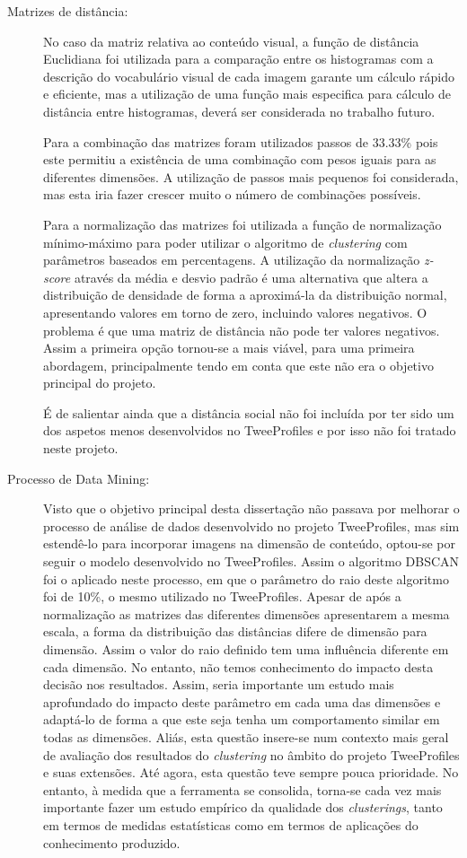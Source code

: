 \begin{description}
\item [Matrizes de distância:]
No caso da matriz relativa ao conteúdo visual, a função de distância Euclidiana foi utilizada para a comparação entre os histogramas com a descrição do vocabulário visual de cada imagem garante um cálculo rápido e eficiente, mas a utilização de uma função mais especifica para cálculo de distância entre histogramas, deverá ser considerada no trabalho futuro.

Para a combinação das matrizes foram utilizados passos de 33.33\% pois este permitiu a existência de uma combinação com pesos iguais para as diferentes dimensões. A utilização de passos mais pequenos foi considerada, mas esta iria fazer crescer muito o número de combinações possíveis. %

Para a normalização das matrizes foi utilizada a função de normalização mínimo-máximo para poder utilizar o algoritmo de \textit{clustering} com parâmetros baseados em percentagens. A utilização da normalização \textit{z-score} através da média e desvio padrão é uma alternativa que altera a distribuição de densidade de forma a aproximá-la da distribuição normal, apresentando valores em torno de zero, incluindo valores negativos. O problema é que uma matriz de distância não pode ter valores negativos. Assim a primeira opção tornou-se a mais viável, para uma primeira abordagem, principalmente tendo em conta que este não era o objetivo principal do projeto.

É de salientar ainda que a distância social não foi incluída por ter sido um dos aspetos menos desenvolvidos no TweeProfiles e por isso não foi tratado neste projeto.

\item [Processo de Data Mining:]
Visto que o objetivo principal desta dissertação não passava por melhorar o processo de análise de dados desenvolvido no projeto TweeProfiles, mas sim estendê-lo para incorporar imagens na dimensão de conteúdo, optou-se por seguir o modelo desenvolvido no TweeProfiles. Assim o algoritmo DBSCAN foi o aplicado neste processo, em que o parâmetro do raio deste algoritmo foi de 10\%, o mesmo utilizado no TweeProfiles. Apesar de após a normalização as matrizes das diferentes dimensões apresentarem a mesma escala, a forma da distribuição das distâncias difere de dimensão para dimensão. Assim o valor do raio definido tem uma influência diferente em cada dimensão. No entanto, não temos conhecimento do impacto desta decisão nos resultados. Assim, seria importante um estudo mais aprofundado do impacto deste parâmetro em cada uma das dimensões e adaptá-lo de forma a que este seja tenha um comportamento similar em todas as dimensões. Aliás, esta questão insere-se num contexto mais geral de avaliação dos resultados do \textit{clustering} no âmbito do projeto TweeProfiles e suas extensões. Até agora, esta questão teve sempre pouca prioridade. No entanto, à medida que a ferramenta se consolida, torna-se cada vez mais importante fazer um estudo empírico da qualidade dos \textit{clusterings}, tanto em termos de medidas estatísticas como em termos de aplicações do conhecimento produzido.


\end{description}
